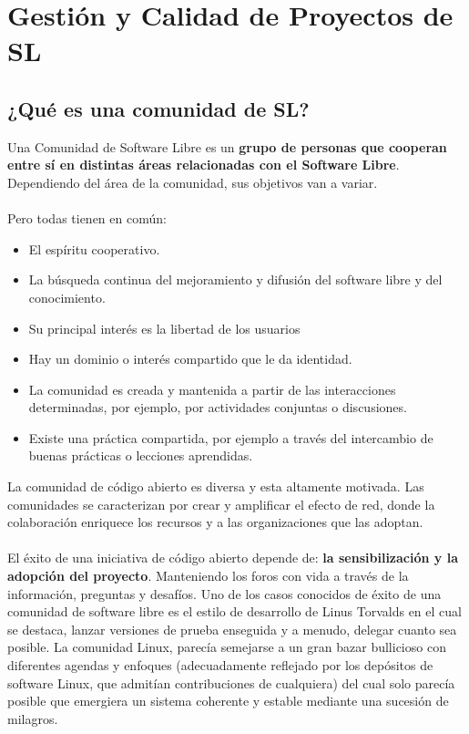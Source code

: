 \chapter{Gestión y Calidad de Proyectos de SL}
\section{¿Qué es una comunidad de SL?}

Una Comunidad de Software Libre es un {\bf grupo de personas que cooperan entre sí en distintas áreas relacionadas con el Software Libre}. Dependiendo del área de la comunidad, sus objetivos van a variar.
\\
\\
Pero todas tienen en común:

\begin{itemize}
     \item El espíritu cooperativo. 
     \item La búsqueda continua del mejoramiento y difusión del software libre y del conocimiento.
     \item Su principal interés es la libertad de los usuarios
     \item Hay un dominio o interés compartido que le da identidad.
     \item La comunidad es creada y mantenida a partir de las interacciones determinadas, por ejemplo, por actividades conjuntas o discusiones.
     \item Existe una práctica compartida, por ejemplo a través del intercambio de buenas prácticas o lecciones aprendidas.
\end{itemize}

La comunidad de código abierto es diversa y esta altamente motivada. Las comunidades se caracterizan por crear y amplificar el efecto de red, donde la colaboración enriquece los recursos y a las organizaciones que las adoptan.
\\
\\
El éxito de una iniciativa de código abierto depende de: {\bf la sensibilización y la adopción del proyecto}. Manteniendo los foros con vida a través de la información, preguntas y desafíos.
Uno de los casos conocidos de éxito de una comunidad de software libre es el estilo de desarrollo de Linus Torvalds en el cual se destaca, lanzar versiones de prueba enseguida y a menudo, delegar cuanto sea posible. La comunidad Linux, parecía semejarse a un gran bazar bullicioso con diferentes agendas y enfoques (adecuadamente reflejado por los depósitos de software Linux, que admitían contribuciones de cualquiera) del cual solo parecía posible que emergiera un sistema coherente y estable mediante una sucesión de milagros. 

